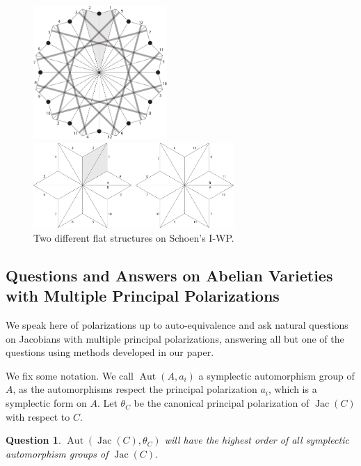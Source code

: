\documentclass[12pt,reqno]{amsart}
\DeclareMathOperator{\Aut}{Aut}
\DeclareMathOperator{\Jac}{Jac}
\newtheorem*{question}{Question}
\theoremstyle{definition}
\theoremstyle{remark}
\begin{document}
\begin{figure}[htbp] 
\centering
\begin{minipage}{0.5\textwidth}
  \centering
  \includegraphics[width=2in]{figures/147_flat.pdf}
\end{minipage}%
\begin{minipage}{0.5\textwidth}
  \centering
  \includegraphics[width=3in]{figures/147_flat_2.pdf}
\end{minipage}
  \caption{Two different flat structures on Schoen's I-WP.}
  \label{fig:147}
\end{figure}

\subsection{Questions and Answers on Abelian Varieties with Multiple Principal Polarizations}
\label{sec:questions}

We speak here of polarizations up to auto-equivalence and ask natural questions on Jacobians with multiple principal polarizations, answering all but one of the questions using methods developed in our paper.

We fix some notation. We call $\Aut(A, a_i)$ a symplectic automorphism group of $A$, as the automorphisms respect the principal polarization $a_i$, which is a symplectic form on $A$. Let $\theta_C$ be the canonical principal polarization of $\Jac(C)$ with respect to $C$.

\begin{question} $\Aut(\Jac(C), \theta_C)$ will have the highest order of all symplectic automorphism groups of $\Jac(C)$. \end{question}
\end{document}
